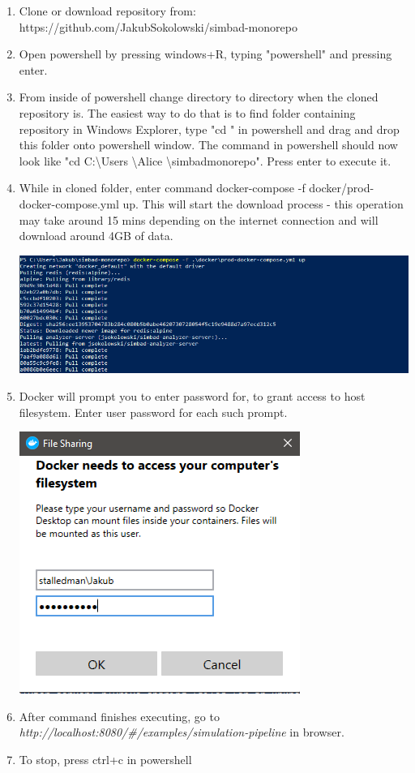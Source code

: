 \begin{enumerate}
\begin{minipage}{\linewidth}
        \end{minipage}
    \item Clone or download repository from: \newline
     https://github.com/JakubSokolowski/simbad-monorepo
    \item Open powershell by pressing windows+R, typing "powershell" and pressing enter.
    \item From inside of powershell change directory to directory when the cloned repository is. The easiest way to do that is to find folder containing repository in Windows Explorer, type "cd " in powershell and drag and drop this folder onto powershell window. The command in powershell should now look like "cd C:\textbackslash Users \textbackslash Alice \textbackslash simbad\-monorepo". Press enter to execute it.
    \item While in cloned folder, enter command docker-compose -f docker/prod-docker-compose.yml up. This will start the download process - this operation may take around 15 mins depending on the internet connection and will download around 4GB of data. \newline
        \begin{minipage}{\linewidth}
            \centering
        	\includegraphics[width=0.9\linewidth]{instructions/docker2.PNG}
        \end{minipage}
    \item Docker will prompt you to enter password for, to grant access to host filesystem. Enter user password for each such prompt. \newline
    \begin{minipage}{\linewidth}
        \centering
        \includegraphics[width=0.5\linewidth]{instructions/docker3.PNG}
    \end{minipage}
    \item After command finishes executing, go to \textit{http://localhost:8080/\#/examples/simulation-pipeline } in browser.
    \item To stop, press ctrl+c in powershell
\end{enumerate}
